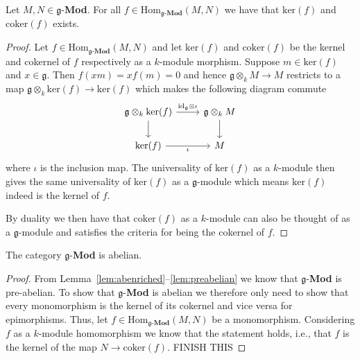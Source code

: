 \begin{lemma}
  \label{lem:preabelian}
Let $ M,N \in \mathfrak{g} $-\textbf{Mod}. For all $ f \in \text{Hom}_{\mathfrak{g}\text{-}\mathbf{Mod}}(M, N) $ we have that $ \text{ker}(f) $ and $ \text{coker}(f) $ exists.
\end{lemma}
\begin{proof}
  Let $ f \in \text{Hom}_{\mathfrak{g}\text{-}\mathbf{Mod}}(M, N) $ and let $ \text{ker}(f) $ and $ \text{coker}(f) $ be the kernel and cokernel of $ f $ respectively as a $ k $-module morphism. Suppose $ m \in \text{ker}(f) $ and $ x \in \mathfrak{g} $. Then $ f(xm)=xf(m)=0 $ and hence $ \mathfrak{g} \otimes_k M \to M $ restricts to a map $ \mathfrak{g} \otimes_k \text{ker}(f) \to \text{ker}(f) $ which makes the following diagram commute
  \[\begin{tikzcd}
	  {\mathfrak{g} \otimes_k \text{ker}(f)} & {\mathfrak{g} \otimes_k M} \\
	  {\text{ker}(f)} & M
	  \arrow[from=1-1, to=2-1]
	  \arrow["\iota"', from=2-1, to=2-2]
	  \arrow[from=1-2, to=2-2]
	  \arrow["{\text{id}_\mathfrak{g} \otimes \iota}", from=1-1, to=1-2]
  \end{tikzcd}\]
  where $ \iota $ is the inclusion map. The universality of $ \text{ker}(f) $ as a $ k $-module then gives the same universality of $ \text{ker}(f) $ as a $ \mathfrak{g} $-module which means $ \text{ker}(f) $ indeed is the kernel of $ f $.

  By duality we then have that $ \text{coker}(f) $ as a $ k $-module can also be thought of as a $ \mathfrak{g} $-module and satisfies the criteria for being the cokernel of $ f $.
\end{proof}

\begin{proposition}
  The category $ \mathfrak{g} $-\textbf{Mod} is abelian.
\end{proposition}
\begin{proof}
  From Lemma~\ref{lem:abenriched}--\ref{lem:preabelian} we know that $ \mathfrak{g} $-\textbf{Mod} is pre-abelian. To show that $ \mathfrak{g} $-\textbf{Mod} is abelian we therefore only need to show that every monomorphism is the kernel of its cokernel and vice versa for epimorphisms. Thus, let $ f \in \text{Hom}_{\mathfrak{g}\text{-}\mathbf{Mod}}(M, N) $ be a monomorphism. Considering $ f $ as a $ k $-module homomorphism we know that the statement holds, i.e., that $ f $ is the kernel of the map $ N \to \text{coker}(f) $. FINISH THIS
\end{proof}


